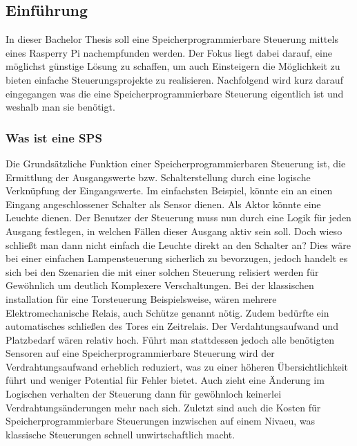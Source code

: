 

\renewcommand{\pthImg}{\pthVerlauf/img}
\renewcommand{\pthDoc}{\pthVerlauf/doc}



\subsection{Einführung}

In dieser Bachelor Thesis soll eine Speicherprogrammierbare Steuerung mittels eines Rasperry Pi nachempfunden werden. Der Fokus liegt dabei darauf, eine möglichst günstige Lösung zu schaffen, um auch Einsteigern die Möglichkeit zu bieten einfache Steuerungsprojekte zu realisieren. Nachfolgend wird kurz darauf eingegangen was die eine Speicherprogrammierbare Steuerung eigentlich ist und weshalb man sie benötigt. 
\subsubsection{Was ist eine SPS}
Die Grundsätzliche Funktion einer Speicherprogrammierbaren Steuerung ist, die Ermittlung der Ausgangswerte bzw. Schalterstellung durch eine logische Verknüpfung der Eingangswerte. Im einfachsten Beispiel, könnte ein an einen Eingang angeschlossener Schalter als Sensor dienen. Als Aktor könnte eine Leuchte dienen. Der Benutzer der Steuerung muss nun durch eine Logik für jeden Ausgang festlegen, in welchen Fällen dieser Ausgang aktiv sein soll. Doch wieso schließt man dann nicht einfach die Leuchte direkt an den Schalter an? Dies wäre bei einer einfachen Lampensteuerung sicherlich zu bevorzugen, jedoch handelt es sich bei den Szenarien die mit einer solchen Steuerung relisiert werden für Gewöhnlich um deutlich Komplexere Verschaltungen. Bei der klassischen installation für eine Torsteuerung Beispielsweise, wären mehrere Elektromechanische Relais, auch Schütze genannt nötig. Zudem bedürfte ein automatisches schließen des Tores ein Zeitrelais. Der Verdahtungsaufwand und Platzbedarf wären relativ hoch. Führt man stattdessen jedoch alle benötigten Sensoren auf eine Speicherprogrammierbare Steuerung wird der Verdrahtungsaufwand erheblich reduziert, was zu einer höheren Übersichtlichkeit führt und weniger Potential für Fehler bietet. Auch zieht eine Änderung im Logischen verhalten der Steuerung dann für gewöhnloch keinerlei Verdrahtungsänderungen mehr nach sich. Zuletzt sind auch die Kosten für Speicherprogrammierbare Steuerungen inzwischen auf einem Nivaeu, was klassische Steuerungen schnell unwirtschaftlich macht. 


